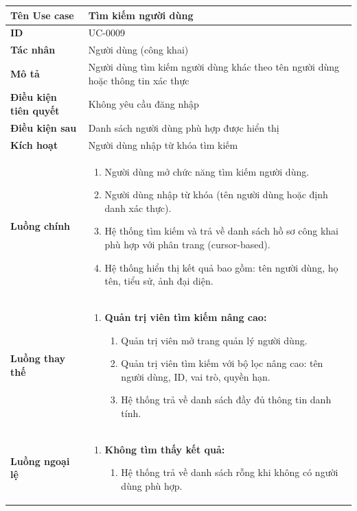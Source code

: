 {
\renewcommand{\arraystretch}{1.5}

\begin{tabularx}{\textwidth}{|>{\raggedright\arraybackslash}X|>{\raggedright\arraybackslash}X|}
\hline
\textbf{Tên Use case} & Tìm kiếm người dùng \\
\hline
\textbf{ID} & UC-0009 \\
\hline
\textbf{Tác nhân} & Người dùng (công khai) \\
\hline
\textbf{Mô tả} & Người dùng tìm kiếm người dùng khác theo tên người dùng hoặc thông tin xác thực \\
\hline
\textbf{Điều kiện tiên quyết} & Không yêu cầu đăng nhập \\
\hline
\textbf{Điều kiện sau} & Danh sách người dùng phù hợp được hiển thị \\
\hline
\textbf{Kích hoạt} & Người dùng nhập từ khóa tìm kiếm \\
\hline
\textbf{Luồng chính} &
\begin{enumerate}
    \item Người dùng mở chức năng tìm kiếm người dùng.
    \item Người dùng nhập từ khóa (tên người dùng hoặc định danh xác thực).
    \item Hệ thống tìm kiếm và trả về danh sách hồ sơ công khai phù hợp với phân trang (cursor-based).
    \item Hệ thống hiển thị kết quả bao gồm: tên người dùng, họ tên, tiểu sử, ảnh đại diện.
\end{enumerate} \\
\hline
\textbf{Luồng thay thế} &
\begin{enumerate}
    \item \textbf{Quản trị viên tìm kiếm nâng cao:}
    \begin{enumerate}
        \item[1A.] Quản trị viên mở trang quản lý người dùng.
        \item[2A.] Quản trị viên tìm kiếm với bộ lọc nâng cao: tên người dùng, ID, vai trò, quyền hạn.
        \item[3A.] Hệ thống trả về danh sách đầy đủ thông tin danh tính.
    \end{enumerate}
\end{enumerate} \\
\hline
\textbf{Luồng ngoại lệ} &
\begin{enumerate}
    \item \textbf{Không tìm thấy kết quả:}
    \begin{enumerate}
        \item[3Err.] Hệ thống trả về danh sách rỗng khi không có người dùng phù hợp.
    \end{enumerate}
\end{enumerate} \\
\hline
\end{tabularx}
}
